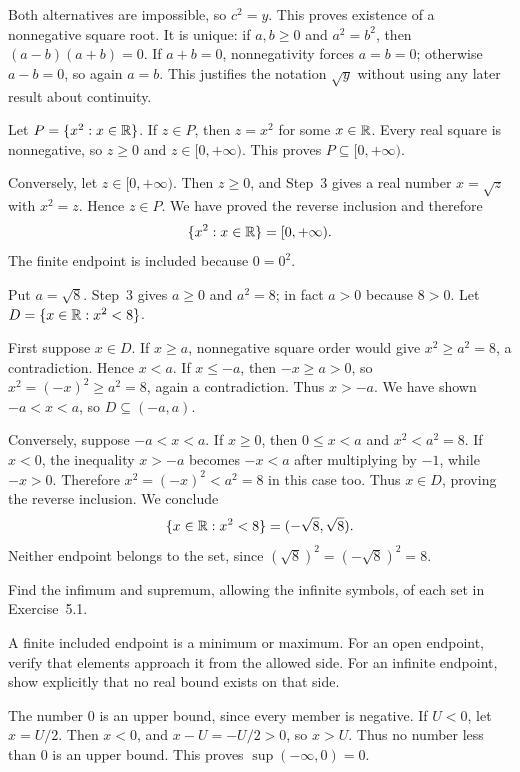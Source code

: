Both alternatives are impossible, so $c^2=y$. This proves existence
of a nonnegative square root. It is unique: if $a,b\ge0$ and
$a^2=b^2$, then $(a-b)(a+b)=0$. If $a+b=0$, nonnegativity forces
$a=b=0$; otherwise $a-b=0$, so again $a=b$. This justifies the
notation $\sqrt y$ without using any later result about continuity.

Let $P=\{x^2:x\in\mathbb{R}\}$. If $z\in P$, then $z=x^2$ for some
$x\in\mathbb{R}$. Every real square is nonnegative, so $z\ge0$ and
$z\in[0,+\infty)$. This proves $P\subseteq[0,+\infty)$.

Conversely, let $z\in[0,+\infty)$. Then $z\ge0$, and Step~3 gives
a real number $x=\sqrt z$ with $x^2=z$. Hence $z\in P$. We have
proved the reverse inclusion and therefore
\[
 \{x^2:x\in\mathbb{R}\}=[0,+\infty).
\]
The finite endpoint is included because $0=0^2$.

Put $a=\sqrt8$. Step~3 gives $a\ge0$ and $a^2=8$; in fact $a>0$
because $8>0$. Let $D=\{x\in\mathbb{R}:x^2<8\}$.

First suppose $x\in D$. If $x\ge a$, nonnegative square order would
give $x^2\ge a^2=8$, a contradiction. Hence $x<a$. If $x\le-a$,
then $-x\ge a>0$, so $x^2=(-x)^2\ge a^2=8$, again a
contradiction. Thus $x>-a$. We have shown $-a<x<a$, so
$D\subseteq(-a,a)$.

Conversely, suppose $-a<x<a$. If $x\ge0$, then $0\le x<a$ and
$x^2<a^2=8$. If $x<0$, the inequality $x>-a$ becomes $-x<a$
after multiplying by $-1$, while $-x>0$. Therefore
$x^2=(-x)^2<a^2=8$ in this case too. Thus $x\in D$, proving the
reverse inclusion. We conclude
\[
 \{x\in\mathbb{R}:x^2<8\}=(-\sqrt8,\sqrt8).
\]
Neither endpoint belongs to the set, since
$(\sqrt8)^2=(-\sqrt8)^2=8$.

\answer{The intervals are
\textup{(a)} $(-\infty,0)$,
\textup{(b)} $(-\infty,2]$,
\textup{(c)} $[0,+\infty)$, and
\textup{(d)} $(-\sqrt8,\sqrt8)$.}

\goal Find the infimum and supremum, allowing the infinite symbols,
of each set in Exercise~5.1.

\idea A finite included endpoint is a minimum or maximum. For an open
endpoint, verify that elements approach it from the allowed side.
For an infinite endpoint, show explicitly that no real bound exists
on that side.

The number $0$ is an upper bound, since every member is negative.
If $U<0$, let $x=U/2$. Then $x<0$, and
$x-U=-U/2>0$, so $x>U$. Thus no number less than $0$ is an upper
bound. This proves $\sup(-\infty,0)=0$.

